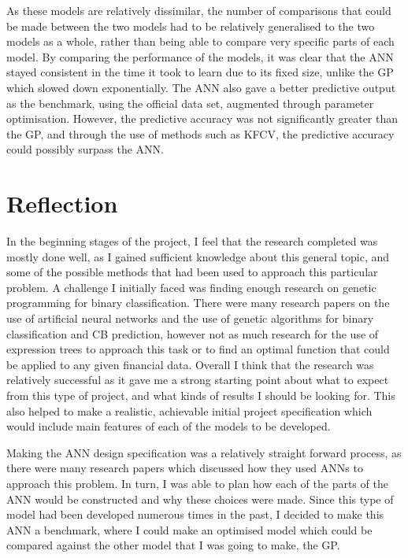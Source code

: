 \documentclass[11pt]{article}
\begin{document}
As these models are relatively dissimilar, the number of comparisons that could be made between the two models had to be relatively generalised to the two models as a whole, rather than being able to compare very specific parts of each model. By comparing the performance of the models, it was clear that the ANN stayed consistent in the time it took to learn due to its fixed size, unlike the GP which slowed down exponentially. The ANN also gave a better predictive output as the benchmark, using the official data set, augmented through parameter optimisation. However, the predictive accuracy was not significantly greater than the GP, and through the use of methods such as KFCV, the predictive accuracy could possibly surpass the ANN. 
\section{Reflection}\label{sec:Refl}
In the beginning stages of the project, I feel that the research completed was mostly done well, as I gained sufficient knowledge about this general topic, and some of the possible methods that had been used to approach this particular problem. A challenge I initially faced was finding enough research on genetic programming for binary classification. There were many research papers on the use of artificial neural networks and the use of genetic algorithms for binary classification and CB prediction, however not as much research for the use of expression trees to approach this task or to find an optimal function that could be applied to any given financial data. Overall I think that the research was relatively successful as it gave me a strong starting point about what to expect from this type of project, and what kinds of results I should be looking for. This also helped to make a realistic, achievable initial project specification which would include main features of each of the models to be developed.

Making the ANN design specification was a relatively straight forward process, as there were many research papers which discussed how they used ANNs to approach this problem. In turn, I was able to plan how each of the parts of the ANN would be constructed and why these choices were made. Since this type of model had been developed numerous times in the past, I decided to make this ANN a benchmark, where I could make an optimised model which could be compared against the other model that I was going to make, the GP. 
\end{document}
